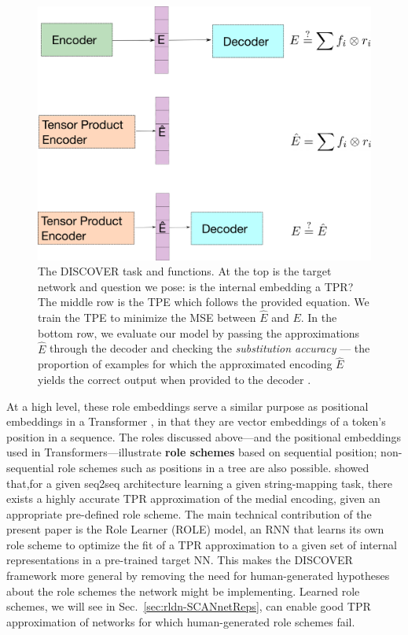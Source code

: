 \begin{figure}[t]
    \centering
    \includegraphics[scale=.25]{images/rldn/task.png}
    \caption{The DISCOVER task and functions. At the top is the target network and question we pose: is the internal embedding a TPR? The middle row is the TPE which follows the provided equation. We train the TPE to minimize the MSE between $\hat{E}$ and $E$. In the bottom row, we evaluate our model by passing the approximations $\hat{E}$ through the decoder and checking the \textit{substitution accuracy} --- the proportion of examples for which the approximated encoding $\hat{E}$ yields the correct output when provided to the decoder .}
    \label{fig:discover}
\end{figure}

At a high level, these role embeddings serve a similar purpose as positional embeddings in a Transformer \citep{vaswani2017attention}, in that they are vector embeddings of a token's position in a sequence. The roles discussed above---and the positional embeddings used in Transformers---illustrate \textbf{role schemes} based on sequential position; non-sequential role schemes such as positions in a tree are also possible. \citet{mccoy} showed that,for a given seq2seq architecture learning a given string-mapping task, there exists a highly accurate TPR approximation of the medial encoding, given an appropriate  pre-defined role scheme. The main technical contribution of the present paper is the Role Learner (ROLE) model, an RNN that learns its own role scheme to optimize the fit of a TPR approximation to a given set of internal representations in a pre-trained target NN. This makes the DISCOVER framework more general by removing the need for human-generated hypotheses about the role schemes the network might be implementing. Learned role schemes, we will see in Sec.~\ref{sec:rldn-SCANnetReps}, can enable good TPR approximation of networks for which human-generated role schemes fail.

